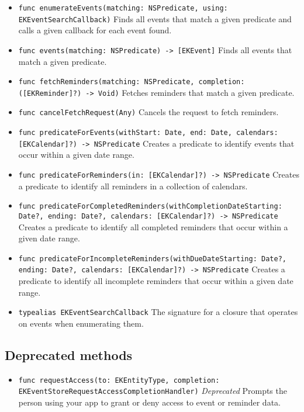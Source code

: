 \documentclass{article}
\begin{document}
\begin{itemize}
    \item \texttt{func enumerateEvents(matching: NSPredicate, using: EKEventSearchCallback)}
    Finds all events that match a given predicate and calls a given callback for each event found.

    \item \texttt{func events(matching: NSPredicate) -> [EKEvent]}
    Finds all events that match a given predicate.

    \item \texttt{func fetchReminders(matching: NSPredicate, completion: ([EKReminder]?) -> Void)}
    Fetches reminders that match a given predicate.

    \item \texttt{func cancelFetchRequest(Any)}
    Cancels the request to fetch reminders.

    \item \texttt{func predicateForEvents(withStart: Date, end: Date, calendars: [EKCalendar]?) -> NSPredicate}
    Creates a predicate to identify events that occur within a given date range.

    \item \texttt{func predicateForReminders(in: [EKCalendar]?) -> NSPredicate}
    Creates a predicate to identify all reminders in a collection of calendars.

    \item \texttt{func predicateForCompletedReminders(withCompletionDateStarting: Date?, ending: Date?, calendars: [EKCalendar]?) -> NSPredicate}
    Creates a predicate to identify all completed reminders that occur within a given date range.

    \item \texttt{func predicateForIncompleteReminders(withDueDateStarting: Date?, ending: Date?, calendars: [EKCalendar]?) -> NSPredicate}
    Creates a predicate to identify all incomplete reminders that occur within a given date range.

    \item \texttt{typealias EKEventSearchCallback}
    The signature for a closure that operates on events when enumerating them.
\end{itemize}

\subsection*{Deprecated methods}

\begin{itemize}
    \item \texttt{func requestAccess(to: EKEntityType, completion: EKEventStoreRequestAccessCompletionHandler)} \textit{Deprecated}
    Prompts the person using your app to grant or deny access to event or reminder data.
\end{itemize}
\end{document}
